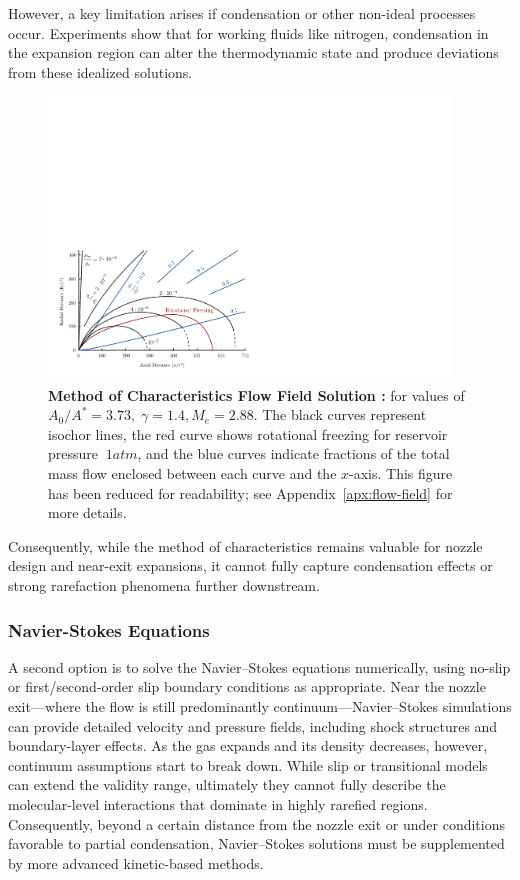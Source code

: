 		However, a key limitation arises if condensation or other non-ideal processes occur.
		Experiments show that for working fluids like nitrogen, condensation in the expansion region can alter the thermodynamic state and produce deviations from these idealized solutions.
		\begin{figure}[H]
			\raggedright
		    \includegraphics[width=0.95\textwidth]{src/03_analytical-work/fig_velocity-distribution-reduced.pdf}
			\caption[Method of Characteristics Flow Field Solution \cite{Cassanova1965}]{
				\textbf{Method of Characteristics Flow Field Solution \cite{Cassanova1965}:}
				for values of $A_0/A^* = 3.73,\;\gamma=1.4,M_e =2.88$.
				The black curves represent isochor lines, the red curve shows rotational freezing for reservoir pressure $~1atm$, and the blue curves indicate fractions of the total mass flow enclosed between each curve and the $x$-axis. 
				This figure has been reduced for readability; see Appendix~\ref{apx:flow-field} for more details.
			}
		\end{figure}
		Consequently, while the method of characteristics remains valuable for nozzle design and near-exit expansions, it cannot fully capture condensation effects or strong rarefaction phenomena further downstream.
		\cite{jousten_handbook_2016, robertson_investigation_1970, noauthor_zucrow_nodate}

\subsubsection*{Navier-Stokes Equations}
	A second option is to solve the Navier–Stokes equations numerically, using no-slip or first/second-order slip boundary conditions as appropriate.
	Near the nozzle exit—where the flow is still predominantly continuum—Navier–Stokes simulations can provide detailed velocity and pressure fields, including shock structures and boundary-layer effects.
	As the gas expands and its density decreases, however, continuum assumptions start to break down.
	While slip or transitional models can extend the validity range, ultimately they cannot fully describe the molecular-level interactions that dominate in highly rarefied regions.
	Consequently, beyond a certain distance from the nozzle exit or under conditions favorable to partial condensation, Navier–Stokes solutions must be supplemented by more advanced kinetic-based methods.
	\cite{anderson_fundamentals_2017, anderson2021modern}

